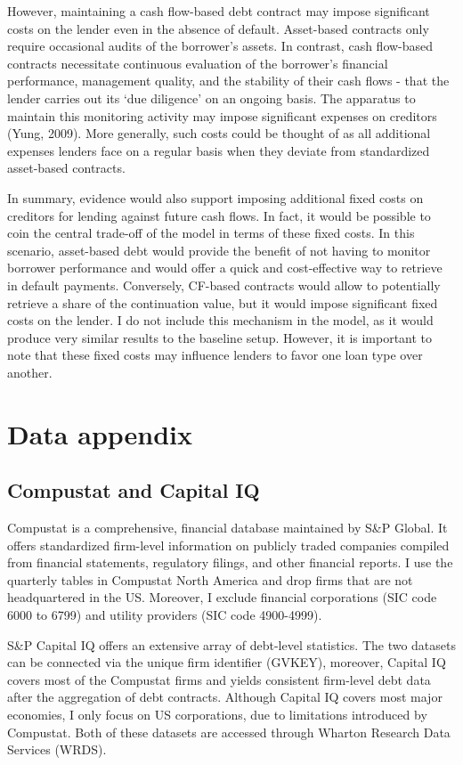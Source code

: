 \documentclass[12pt]{article}
\begin{document}
However, maintaining a cash flow-based debt contract may impose significant costs on the lender even in the absence of default. Asset-based contracts only require occasional audits of the borrower's assets. In contrast, cash flow-based contracts necessitate continuous evaluation of the borrower's financial performance, management quality, and the stability of their cash flows - that the lender carries out its `due diligence' on an ongoing basis. The apparatus to maintain this monitoring activity may impose significant expenses on creditors (Yung, 2009). More generally, such costs could be thought of as all additional expenses lenders face on a regular basis when they deviate from standardized asset-based contracts.



In summary, evidence would also support imposing additional fixed costs on creditors for lending against future cash flows. In fact, it would be possible to coin the central trade-off of the model in terms of these fixed costs. In this scenario, asset-based debt would provide the benefit of not having to monitor borrower performance and would offer a quick and cost-effective way to retrieve in default payments. Conversely, CF-based contracts would allow to potentially retrieve a share of the continuation value, but it would impose significant fixed costs on the lender. I do not include this mechanism in the model, as it would produce very similar results to the baseline setup. However, it is important to note that these fixed costs may influence lenders to favor one loan type over another.


\section{Data appendix \label{sec:A3}}
\subsection{Compustat and Capital IQ}
Compustat is a comprehensive, financial database maintained by S\&P Global. It offers standardized firm-level information on publicly traded companies compiled from financial statements, regulatory filings, and other financial reports. I use the quarterly tables in Compustat North America and drop firms that are not headquartered in the US. Moreover, I exclude financial corporations (SIC code 6000 to 6799) and utility providers (SIC code 4900-4999). 

S\&P Capital IQ offers an extensive array of debt-level statistics. The two datasets can be connected via the unique firm identifier (GVKEY), moreover, Capital IQ covers most of the Compustat firms and yields consistent firm-level debt data after the aggregation of debt contracts. Although Capital IQ covers most major economies, I only focus on US corporations, due to limitations introduced by Compustat. Both of these datasets are accessed through Wharton Research Data Services (WRDS). 
\end{document}
